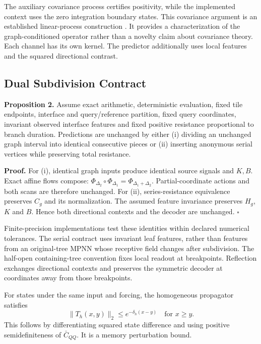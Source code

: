 \documentclass[letterpaper]{article}
\begin{document}
The auxiliary covariance process certifies positivity, while the implemented context uses the zero integration boundary states. This covariance argument is an established linear-process construction \citep{sdes2019}. It provides a characterization of the graph-conditioned operator rather than a novelty claim about covariance theory. Each channel has its own kernel. The predictor additionally uses local features and the squared directional contrast.

\subsection{Dual Subdivision Contract}
\textbf{Proposition 2.}
Assume exact arithmetic, deterministic evaluation, fixed tile endpoints, interface and query/reference partition, fixed query coordinates, invariant observed interface features and fixed positive resistance proportional to branch duration. Predictions are unchanged by either (i) dividing an unchanged graph interval into identical consecutive pieces or (ii) inserting anonymous serial vertices while preserving total resistance.

\textbf{Proof.}
For (i), identical graph inputs produce identical source signals and $K,B$. Exact affine flows compose:
$\Phi_{\Delta_2}\circ\Phi_{\Delta_1}=\Phi_{\Delta_1+\Delta_2}$.
Partial-coordinate actions and both scans are therefore unchanged. For (ii), series-resistance equivalence preserves $C_g$ and its normalization. The assumed feature invariance preserves $H_g$, $K$ and $B$. Hence both directional contexts and the decoder are unchanged. $\square$

Finite-precision implementations test these identities within declared numerical tolerances. The serial contract uses invariant leaf features, rather than features from an original-tree MPNN whose receptive field changes after subdivision. The half-open containing-tree convention fixes local readout at breakpoints. Reflection exchanges directional contexts and preserves the symmetric decoder at coordinates away from those breakpoints.

For states under the same input and forcing, the homogeneous propagator satisfies
\begin{equation}
 \|T_h(x,y)\|_2\leq e^{-\delta_h(x-y)}
 \quad\text{for }x\geq y.
\end{equation}
This follows by differentiating squared state difference and using positive semidefiniteness of $\bar C_{QQ}$. It is a memory perturbation bound.
\end{document}
